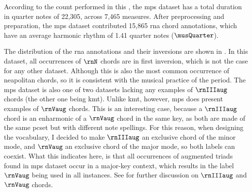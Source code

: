 
According to the count performed in this \thesisdiss{}, the
\gls{mps} dataset has a total duration in quarter notes of
22,305, across 7,465 measures. After preprocessing and
preparation, the \gls{mps} dataset contributed 15,865
\gls{rna} chord annotations, which have an average harmonic
rhythm of 1.41 quarter notes ($\musQuarter$).

The distribution of the \gls{rna} annotations and their
inversions are shown in . In this
dataset, all occurrences of $\rnN$ chords are in first
inversion, which is not the case for any other dataset.
Although this is also the most common occurrence of
\gls{neapolitan} chords, so it is consistent with the
musical practice of the period. The \gls{mps} dataset is
also one of two datasets lacking any examples of $\rnIIIaug$
chords (the other one being \gls{kmt}). Unlike \gls{kmt},
however, \gls{mps} does present examples of $\rnVaug$
chords. This is an interesting case, because a $\rnIIIaug$
chord is an enharmonic of a $\rnVaug$ chord in the same key,
as both are made of the same \gls{pcset} but with different
note spellings. For this reason, when designing the
vocabulary, I decided to make $\rnIIIaug$ an exclusive chord
of the minor mode, and $\rnVaug$ an exclusive chord of the
major mode, so both labels can coexist. What this indicates
here, is that all occurrences of augmented triads found in
\gls{mps} dataset occur in a major-key context, which
results in the label $\rnVaug$ being used in all instances.
See 
for further discussion on $\rnIIIaug$ and $\rnVaug$ chords.


